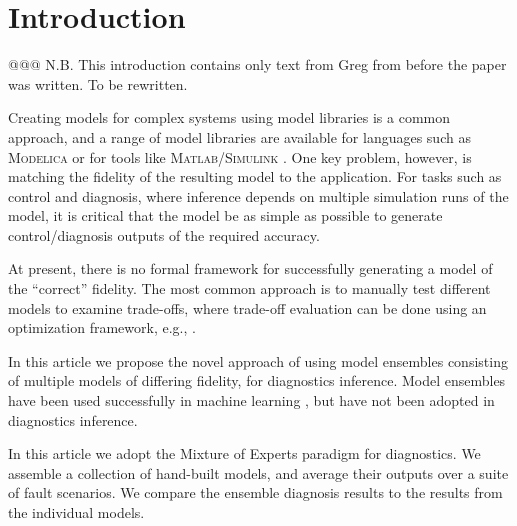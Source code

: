 \section{Introduction}
%
@@@ N.B. This introduction contains only text from Greg from before the paper was written. To be rewritten.
\par
Creating models for complex systems using model libraries is a common
approach, and a range of model libraries are available for languages
such as \textsc{Modelica} \citep{?} or for tools like
\textsc{Matlab}/\textsc{Simulink} \citep{?}. One key problem, however,
is matching the fidelity of the resulting model to the application.
For tasks such as control and diagnosis, where inference depends on
multiple simulation runs of the model, it is critical that the model
be as simple as possible to generate control/diagnosis outputs of the
required accuracy.
\par
At present, there is no formal framework for successfully generating a
model of the ``correct'' fidelity. The most common approach is to
manually test different models to examine trade-offs, where trade-off
evaluation can be done using an optimization framework, e.g.,
\citep{wetter2001genopt}.
\par
In this article we propose the novel approach of using model ensembles
consisting of multiple models of differing fidelity, for diagnostics
inference. Model ensembles have been used successfully in machine
learning \citep{brown2010ensemble,dietterich2000ensemble}, but have
not been adopted in diagnostics inference.
\par
In this article we adopt the Mixture of Experts paradigm
\citep{brown2010ensemble} for diagnostics. We assemble a collection of
hand-built models, and average their outputs over a suite of fault
scenarios. We compare the ensemble diagnosis results to the results
from the individual models.
